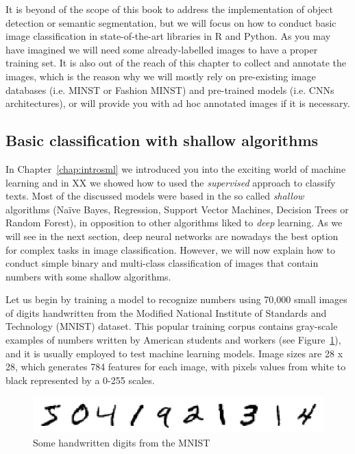 It is beyond of the scope of this book to address the implementation of object detection or semantic segmentation, but we will focus on how to conduct basic image classification in state-of-the-art libraries in R and Python. As you may have imagined we will need some already-labelled images to have a proper training set. It is also out of the reach of this chapter to collect and annotate the images, which is the reason why we will mostly rely on pre-existing image databases (i.e. MINST or Fashion MINST) and pre-trained models (i.e. CNNs architectures), or will provide you with ad hoc annotated images if it is necessary. 

\subsection{Basic classification with shallow algorithms}
\label{subsec:shallow}

In Chapter~\ref{chap:introsml} we introduced you into the exciting world of machine learning and in XX we showed how to used the \textit{supervised} approach to classify texts. Most of the discussed models were based in the so called \textit{shallow} algorithms (Naïve Bayes, Regression, Support Vector Machines, Decision Trees or Random Forest), in opposition to other algorithms liked to \textit{deep} learning. As we will see in the next section, deep neural networks are nowadays the best option for complex tasks in image classification. However, we will now explain how to conduct simple binary and multi-class classification of images that contain numbers with some shallow algorithms.

Let us begin by training a model to recognize numbers using 70,000 small images of digits handwritten from the Modified National Institute of Standards and Technology (MNIST) dataset. This popular training corpus contains gray-scale examples of numbers written by American students and workers (see Figure~\ref{fig:numbers}), and it is usually employed to test machine learning models. Image sizes are 28 x 28, which generates 784 features for each image, with pixels values from white to black represented by a 0-255 scales.

\begin{figure}
\centering
\includegraphics[width=0.9\linewidth]{figures/ch15_numbers.png}
\caption{Some handwritten digits from the MNIST}
\label{fig:numbers}
\end{figure}




